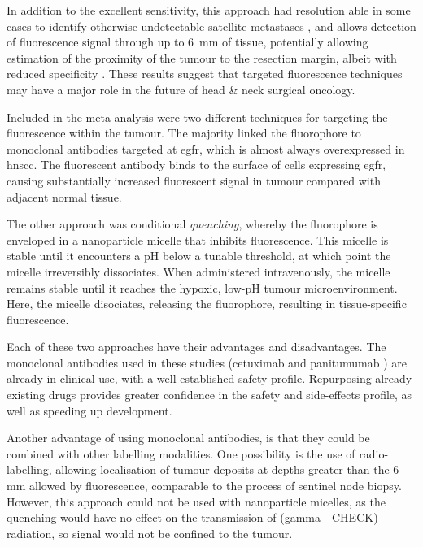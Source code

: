 In addition to the excellent sensitivity, this approach had resolution able in some cases to identify otherwise undetectable satellite metastases \cite{voskuilf.j.ImageguidedSurgeryTumor2019}, and allows detection of fluorescence signal through up to \SI{6}{\milli\metre} of tissue, potentially allowing estimation of the proximity of the tumour to the resection margin, albeit with reduced specificity \cite{vankeulenRapidNoninvasiveFluorescence2019}.
These results suggest that targeted fluorescence techniques may have a major role in the future of head \& neck surgical oncology.

Included in the meta-analysis were two different techniques for targeting the fluorescence within the tumour.
The majority linked the fluorophore to monoclonal antibodies  targeted at \gls{egfr}, which is almost always overexpressed in \gls{hnscc}\cite{chungIncreasedEpidermalGrowth2016}.
The fluorescent antibody binds to the surface of cells expressing \gls{egfr}, causing substantially increased fluorescent signal in tumour compared with adjacent normal tissue.

The other approach was conditional \textit{quenching}, whereby the fluorophore is enveloped in a nanoparticle micelle that inhibits fluorescence\cite{voskuilExploitingMetabolicAcidosis2020}.
This micelle is stable until it encounters a pH below a tunable threshold, at which point the micelle irreversibly dissociates. 
When administered intravenously, the micelle remains stable until it reaches the hypoxic, low-pH tumour microenvironment. 
Here, the micelle disociates, releasing the fluorophore, resulting in tissue-specific fluorescence.

Each of these two approaches have their advantages and disadvantages.
The monoclonal antibodies used in these studies (cetuximab \cite{warramFluorescenceImagingLocalize2016, voskuilf.j.FluorescenceguidedImagingResection2020}and panitumumab \cite{gaor.w.DeterminationTumorMargins2018, vankeulenRapidNoninvasiveFluorescence2019}) are already in clinical use, with a well established safety profile.
Repurposing already existing drugs provides greater confidence in the safety and side-effects profile, as well as speeding up development. 

Another advantage of using monoclonal antibodies, is that they could be combined with other labelling modalities.
One possibility is the use of radio-labelling, allowing localisation of tumour deposits at depths greater than the 6 mm allowed by fluorescence, comparable to the process of sentinel node biopsy.
However, this approach could not be used with nanoparticle micelles, as the quenching would have no effect on the transmission of (gamma - CHECK) radiation, so signal would not be confined to the tumour.



